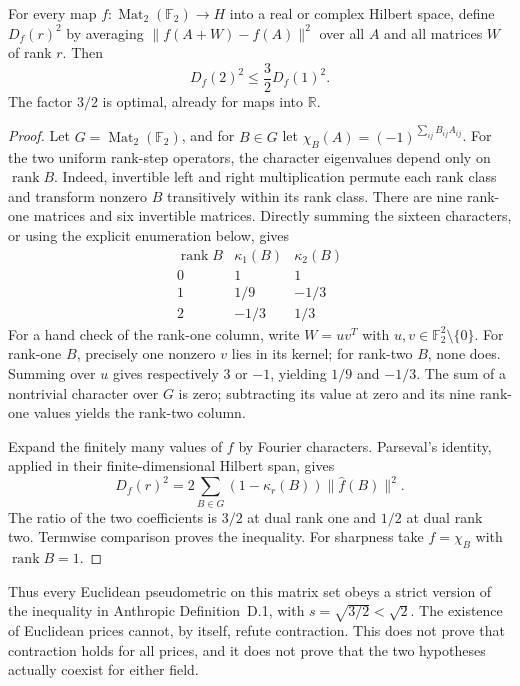 \begin{proposition}
\label{pg:hilbert}
For every map $f:\operatorname{Mat}_2(\mathbb F_2)\to H$ into a real or
complex Hilbert space, define $D_f(r)^2$ by averaging
$\|f(A+W)-f(A)\|^2$ over all $A$ and all matrices $W$ of rank $r$.
Then
\[
 D_f(2)^2\leq\frac32 D_f(1)^2.
\]
The factor $3/2$ is optimal, already for maps into $\mathbb R$.
\end{proposition}
\begin{proof}
Let $G=\operatorname{Mat}_2(\mathbb F_2)$, and for $B\in G$ let
$\chi_B(A)=(-1)^{\sum_{ij}B_{ij}A_{ij}}$. For the two uniform rank-step
operators, the character eigenvalues depend only on $\operatorname{rank}B$.
Indeed, invertible left and right multiplication permute each rank class
and transform nonzero $B$ transitively within its rank class. There are nine
rank-one matrices and six invertible matrices. Directly summing the sixteen
characters, or using the explicit enumeration below, gives
\[
\begin{array}{c|cc}
\operatorname{rank}B&\kappa_1(B)&\kappa_2(B)\\\hline
0&1&1\\
1&1/9&-1/3\\
2&-1/3&1/3
\end{array}
\]
For a hand check of the rank-one column, write $W=uv^T$ with
$u,v\in\mathbb F_2^2\setminus\{0\}$. For rank-one $B$, precisely one
nonzero $v$ lies in its kernel; for rank-two $B$, none does. Summing over
$u$ gives respectively $3$ or $-1$, yielding $1/9$ and $-1/3$.
The sum of a nontrivial character over $G$ is zero; subtracting its value
at zero and its nine rank-one values yields the rank-two column.

Expand the finitely many values of $f$ by Fourier characters. Parseval's
identity, applied in their finite-dimensional Hilbert span, gives
\[
 D_f(r)^2=2\sum_{B\in G}(1-\kappa_r(B))\|\widehat f(B)\|^2.
\]
The ratio of the two coefficients is $3/2$ at dual rank one and $1/2$
at dual rank two. Termwise comparison proves the inequality. For sharpness
take $f=\chi_B$ with $\operatorname{rank}B=1$.
\end{proof}

Thus every Euclidean pseudometric on this matrix set obeys a strict version
of the inequality in Anthropic Definition~D.1, with $s=\sqrt{3/2}<\sqrt2$.
The existence of Euclidean prices cannot, by itself, refute contraction.
This does not prove that contraction holds for all prices, and it does not
prove that the two hypotheses actually coexist for either field.

